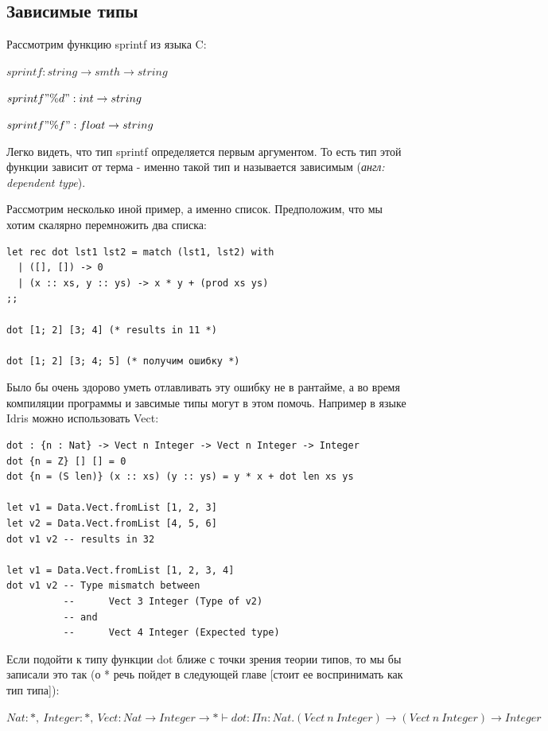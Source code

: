 \documentclass[12pt]{article}
\begin{document}
\subsection{Зависимые типы}
    
Рассмотрим функцию sprintf из языка C:
    
    $sprintf : string \rightarrow smth \rightarrow string$
    
    $sprintf "\%d" : int \rightarrow string$
    
    $sprintf "\%f" : float \rightarrow string$
    
Легко видеть, что тип sprintf определяется первым аргументом. То есть тип этой функции зависит от терма - именно такой тип и называется зависимым (\textit{англ: dependent type}). 

Рассмотрим несколько иной пример, а именно список. Предположим, что мы хотим скалярно перемножить два списка: 

\begin{verbatim}
let rec dot lst1 lst2 = match (lst1, lst2) with
  | ([], []) -> 0
  | (x :: xs, y :: ys) -> x * y + (prod xs ys)
;;

dot [1; 2] [3; 4] (* results in 11 *)

dot [1; 2] [3; 4; 5] (* получим ошибку *)

\end{verbatim}

Было бы очень здорово уметь отлавливать эту ошибку не в рантайме, а во время компиляции программы и завсимые типы могут в этом помочь. Например в языке Idris можно использовать Vect: 

\begin{verbatim}
dot : {n : Nat} -> Vect n Integer -> Vect n Integer -> Integer
dot {n = Z} [] [] = 0
dot {n = (S len)} (x :: xs) (y :: ys) = y * x + dot len xs ys 

let v1 = Data.Vect.fromList [1, 2, 3]
let v2 = Data.Vect.fromList [4, 5, 6]
dot v1 v2 -- results in 32

let v1 = Data.Vect.fromList [1, 2, 3, 4]
dot v1 v2 -- Type mismatch between
          --      Vect 3 Integer (Type of v2)
          -- and
          --      Vect 4 Integer (Expected type)
\end{verbatim}

Если подойти к типу функции dot ближе с точки зрения теории типов, то мы бы записали это так (о * речь пойдет в следующей главе [стоит ее воспринимать как тип типа]):

$Nat : *,\ Integer : *,\ Vect : Nat \rightarrow Integer \rightarrow * \vdash dot : \Pi n : Nat. (Vect\ n\ Integer) \rightarrow (Vect\ n\ Integer) \rightarrow Integer$
\end{document}
